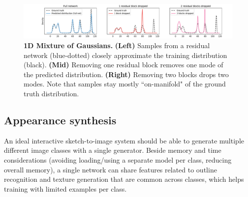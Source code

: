\begin{figure}[t]
    \centering
    \includegraphics[width=\linewidth,trim={2.6cm 0 1.8cm 0},clip]{paper_images/mog.pdf}
    \caption{{\bf 1D Mixture of Gaussians.} {\bf (Left)} Samples from a residual network (blue-dotted) closely approximate the training distribution (black). {\bf (Mid)} Removing one residual block removes one mode of the predicted distribution. {\bf (Right)} Removing two blocks drops two modes. Note that samples stay mostly ``on-manifold" of the ground truth distribution.
    }\label{fig:onedexperiment}
\end{figure}

\subsection{Appearance synthesis}
\label{sec:appearance}
An ideal interactive sketch-to-image system  should be able to generate multiple different image classes with a single generator. 
Beside memory and time considerations (avoiding loading/using a separate model per class, reducing overall memory), a single network can share features related to outline recognition and texture generation that are common across classes, which helps training with limited examples per class. %

